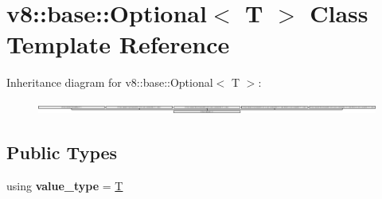 \hypertarget{classv8_1_1base_1_1Optional}{}\section{v8\+:\+:base\+:\+:Optional$<$ T $>$ Class Template Reference}
\label{classv8_1_1base_1_1Optional}
Inheritance diagram for v8\+:\+:base\+:\+:Optional$<$ T $>$\+:\begin{figure}[H]
\begin{center}
\leavevmode
\includegraphics[height=0.329412cm]{classv8_1_1base_1_1Optional}
\end{center}
\end{figure}
\subsection*{Public Types}
\begin{DoxyCompactItemize}
\item 
\mbox{\label{classv8_1_1base_1_1Optional_a362c214686f555792d0fb25ab6cee607}} 
using {\bfseries value\+\_\+type} = \mbox{\hyperlink{classv8_1_1internal_1_1torque_1_1T}{T}}
\end{DoxyCompactItemize}
